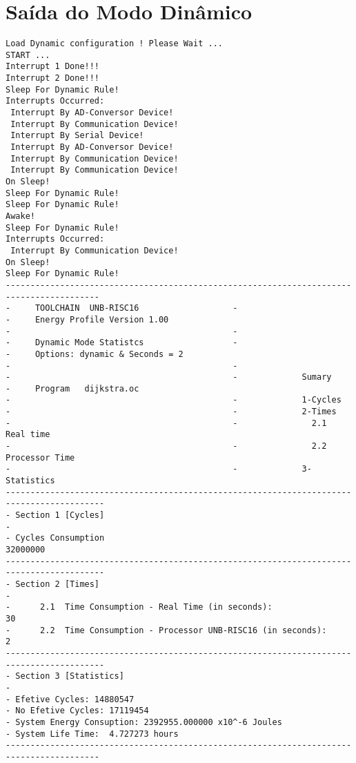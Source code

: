 \section{Saída do Modo Dinâmico}
\scriptsize
\begin{verbatim}
Load Dynamic configuration ! Please Wait ... 
START ... 
Interrupt 1 Done!!!
Interrupt 2 Done!!!
Sleep For Dynamic Rule!
Interrupts Occurred: 
 Interrupt By AD-Conversor Device! 
 Interrupt By Communication Device! 
 Interrupt By Serial Device! 
 Interrupt By AD-Conversor Device! 
 Interrupt By Communication Device! 
 Interrupt By Communication Device! 
On Sleep!
Sleep For Dynamic Rule!
Sleep For Dynamic Rule!
Awake!
Sleep For Dynamic Rule!
Interrupts Occurred: 
 Interrupt By Communication Device! 
On Sleep!
Sleep For Dynamic Rule!
-----------------------------------------------------------------------------------------
-     TOOLCHAIN  UNB-RISC16                   -                                          
-     Energy Profile Version 1.00                                                         
-                                             -                                            
-     Dynamic Mode Statistcs                  -                                            
-     Options: dynamic & Seconds = 2       
-                                             -                                            
-                                             -             Sumary                       
-     Program   dijkstra.oc
-                                             -             1-Cycles                     
-                                             -             2-Times                      
-                                             -               2.1    Real time           
-                                             -               2.2    Processor Time      
-                                             -             3-Statistics
------------------------------------------------------------------------------------------
- Section 1 [Cycles]                                                                      
-                                                                                         
- Cycles Consumption                                                   32000000                 
------------------------------------------------------------------------------------------
- Section 2 [Times]                                                                       
-                                                                                         
-      2.1  Time Consumption - Real Time (in seconds):                 30                 
-      2.2  Time Consumption - Processor UNB-RISC16 (in seconds):      2                 
------------------------------------------------------------------------------------------
- Section 3 [Statistics]                                                  
-                                                                                         
- Efetive Cycles: 14880547
- No Efetive Cycles: 17119454
- System Energy Consuption: 2392955.000000 x10^-6 Joules
- System Life Time:  4.727273 hours
-----------------------------------------------------------------------------------------
\end{verbatim}

